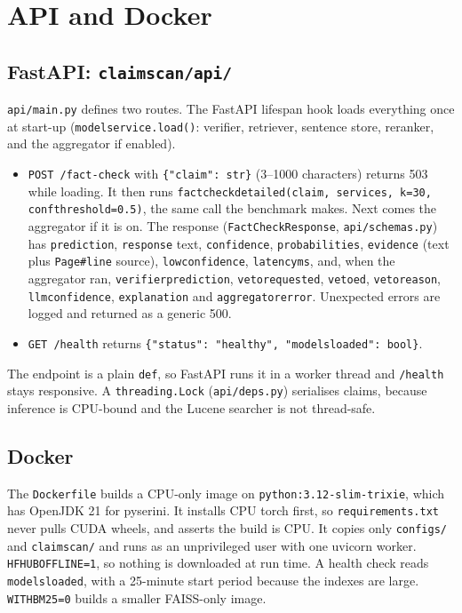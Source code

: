 \documentclass[11pt,a4paper]{article}
\makeatletter
\DeclareRobustCommand{\_}{\ifmmode\nfss@text{\textunderscore}\else\textunderscore\allowbreak\fi}
\newcommand{\file}[1]{\texttt{#1}}
\makeatother
\begin{document}
\section{API and Docker}

\subsection{FastAPI: \file{claimscan/api/}}

\file{api/main.py} defines two routes. The FastAPI lifespan hook loads everything once at start-up
(\texttt{model\_service.load()}: verifier, retriever, sentence store, reranker, and the aggregator if enabled).
\begin{itemize}
  \item \texttt{POST /fact-check} with \texttt{\{"claim": str\}} (3--1000 characters) returns 503 while loading. It
        then runs \texttt{fact\_check\_detailed(claim, services, k=30, conf\_threshold=0.5)}, the same call the
        benchmark makes. Next comes the aggregator if it is on. The response (\texttt{FactCheckResponse},
        \file{api/schemas.py}) has \texttt{prediction}, \texttt{response} text, \texttt{confidence},
        \texttt{probabilities}, \texttt{evidence} (text plus \texttt{Page\#line} source), \texttt{low\_confidence},
        \texttt{latency\_ms}, and, when the aggregator ran, \texttt{verifier\_prediction}, \texttt{veto\_requested},
        \texttt{vetoed}, \texttt{veto\_reason}, \texttt{llm\_confidence}, \texttt{explanation} and
        \texttt{aggregator\_error}. Unexpected errors are logged and returned as a generic 500.
  \item \texttt{GET /health} returns \texttt{\{"status": "healthy", "models\_loaded": bool\}}.
\end{itemize}
The endpoint is a plain \texttt{def}, so FastAPI runs it in a worker thread and \texttt{/health} stays responsive.
A \texttt{threading.Lock} (\file{api/deps.py}) serialises claims, because inference is CPU-bound and the Lucene
searcher is not thread-safe.

\subsection{Docker}

The \file{Dockerfile} builds a CPU-only image on \texttt{python:3.12-slim-trixie}, which has OpenJDK 21 for pyserini.
It installs CPU torch first, so \texttt{requirements.txt} never pulls CUDA wheels, and asserts the build is CPU. It
copies only \file{configs/} and \file{claimscan/} and runs as an unprivileged user with one uvicorn worker.
\texttt{HF\_HUB\_OFFLINE=1}, so nothing is downloaded at run time. A health check reads
\texttt{models\_loaded}, with a 25-minute start period because the indexes are large. \texttt{WITH\_BM25=0} builds a
smaller FAISS-only image.
\end{document}
